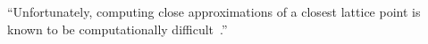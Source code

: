 \documentclass[a4paper,10pt]{article}
\begin{document}
\begin{enumerate}
``Unfortunately, computing close approximations of a closest lattice point is known to be computationally difficult~\cite{feige_inapproximability_2004,Regev_2004_inappox_lattice_with_preprocessing,Aharonov_Regev_2005,Aleknovish_hardness_with_preprocessing_2011,Dadush_cvp_with_distance_guarantee_2014}.''

\end{enumerate}




%

\end{document}
